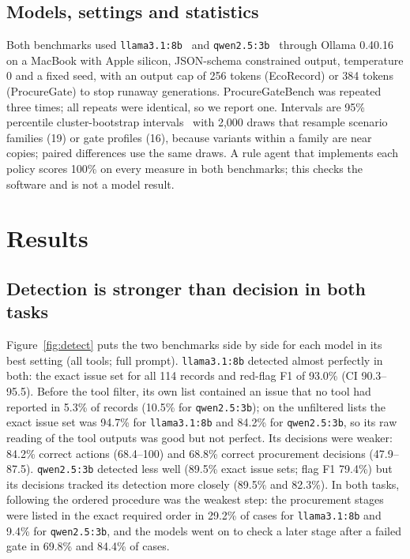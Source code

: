\documentclass[11pt,a4paper]{article}
\newcommand{\code}[1]{\texttt{#1}}
\begin{document}
\subsection{Models, settings and statistics}

Both benchmarks used \code{llama3.1:8b}~\cite{grattafiori2024llama3} and \code{qwen2.5:3b}~\cite{qwen2025qwen25}
through Ollama 0.40.16 on a MacBook with Apple silicon, JSON-schema constrained output, temperature 0 and a fixed
seed, with an output cap of 256 tokens (EcoRecord) or 384 tokens (ProcureGate) to stop runaway generations. ProcureGateBench was repeated three times; all repeats were identical, so we
report one. Intervals are 95\% percentile cluster-bootstrap intervals~\cite{efron1993bootstrap} with 2,000 draws
that resample scenario families (19) or gate profiles (16), because variants within a family are near copies;
paired differences use the same draws. A rule agent that implements each policy scores 100\% on every measure in
both benchmarks; this checks the software and is not a model result.

\section{Results}

\subsection{Detection is stronger than decision in both tasks}

Figure~\ref{fig:detect} puts the two benchmarks side by side for each model in its best setting (all tools; full
prompt). \code{llama3.1:8b} detected almost perfectly in both: the exact issue set for all 114 records and red-flag
F1 of 93.0\% (CI 90.3--95.5). Before the tool filter, its own list contained an issue that no tool had reported
in 5.3\% of records (10.5\% for \code{qwen2.5:3b}); on the unfiltered lists the exact issue set was 94.7\% for
\code{llama3.1:8b} and 84.2\% for \code{qwen2.5:3b}, so its raw reading of the tool outputs was good but not perfect. Its decisions were weaker: 84.2\% correct actions (68.4--100) and 68.8\% correct
procurement decisions (47.9--87.5). \code{qwen2.5:3b} detected less well (89.5\% exact issue sets; flag F1 79.4\%)
but its decisions tracked its detection more closely (89.5\% and 82.3\%). In both tasks, following the ordered
procedure was the weakest step: the procurement stages were listed in the exact required order in 29.2\% of
cases for \code{llama3.1:8b} and 9.4\% for \code{qwen2.5:3b}, and the models went on to check a later stage after
a failed gate in 69.8\% and 84.4\% of cases.
\end{document}
